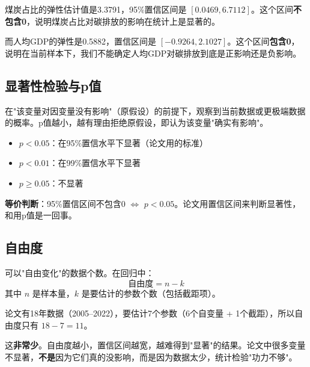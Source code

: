 \documentclass[12pt, a4paper]{article}
\begin{document}
\begin{examplebox}[论文中的实例]
煤炭占比的弹性估计值是3.3791，95\%置信区间是 $[0.0469, 6.7112]$。这个区间\textbf{不包含0}，说明煤炭占比对碳排放的影响在统计上是显著的。

而人均GDP的弹性是0.5882，置信区间是 $[-0.9264, 2.1027]$。这个区间\textbf{包含0}，说明在当前样本下，我们不能确定人均GDP对碳排放到底是正影响还是负影响。
\end{examplebox}

\subsection{显著性检验与p值}

\begin{conceptbox}[p值]
在"该变量对因变量没有影响"（原假设）的前提下，观察到当前数据或更极端数据的概率。p值越小，越有理由拒绝原假设，即认为该变量"确实有影响"。
\end{conceptbox}

\begin{itemize}[leftmargin=2em]
\item $p < 0.05$：在95\%置信水平下显著（论文用的标准）
\item $p < 0.01$：在99\%置信水平下显著
\item $p \geq 0.05$：不显著
\end{itemize}

\begin{tipbox}[置信区间与显著性检验的关系]
\textbf{等价判断}：95\%置信区间不包含0 $\iff$ $p < 0.05$。论文用置信区间来判断显著性，和用p值是一回事。
\end{tipbox}

\subsection{自由度}

\begin{conceptbox}[自由度]
可以"自由变化"的数据个数。在回归中：
\[
\text{自由度} = n - k
\]
其中 $n$ 是样本量，$k$ 是要估计的参数个数（包括截距项）。
\end{conceptbox}

\begin{warningbox}
论文有18年数据（2005--2022），要估计7个参数（6个自变量 + 1个截距），所以自由度只有 $18 - 7 = 11$。

这\textbf{非常少}。自由度越小，置信区间越宽，越难得到"显著"的结果。论文中很多变量不显著，\textbf{不是}因为它们真的没影响，而是因为数据太少，统计检验"功力不够"。
\end{warningbox}
\end{document}
